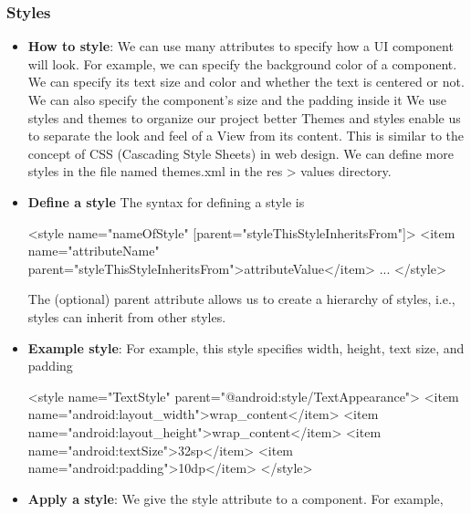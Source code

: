 \documentclass{report}
\begin{document}
    \subsubsection{Styles}
    \begin{itemize}
        \item \textbf{How to style}: We can use many attributes to specify how a UI component will look. For example, we can specify the background color of a component.
            \bigbreak \noindent 
            We can specify its text size and color and whether the text is centered or not. We can also specify the component's size and the padding inside it
            \bigbreak \noindent 
            We use styles and themes to organize our project better
            \bigbreak \noindent 
            Themes and styles enable us to separate the look and feel of a View from its content. This is similar to the concept of CSS (Cascading Style Sheets) in web design.
            \bigbreak \noindent 
            We can define more styles in the file named themes.xml in the res > values directory.
        \item \textbf{Define a style} The syntax for defining a style is 
            \bigbreak \noindent 
            \begin{xmlcode}
                <style name="nameOfStyle"
                    [parent="styleThisStyleInheritsFrom"]>
                    <item name="attributeName" parent="styleThisStyleInheritsFrom">attributeValue</item>
                    ...
                </style>
            \end{xmlcode}
            \bigbreak \noindent 
            The (optional) parent attribute allows us to create a hierarchy of styles, i.e., styles can inherit from other styles.
        \item \textbf{Example style}: For example, this style specifies width, height, text size, and padding
            \bigbreak \noindent 
            \begin{xmlcode}
                <style name="TextStyle"
                    parent="@android:style/TextAppearance">
                    <item name="android:layout_width">wrap_content</item>
                    <item name="android:layout_height">wrap_content</item>
                    <item name="android:textSize">32sp</item>
                    <item name="android:padding">10dp</item>
                </style>
            \end{xmlcode}
        \item \textbf{Apply a style}: We give the style attribute to a component. For example,

\end{itemize}
\end{document}
